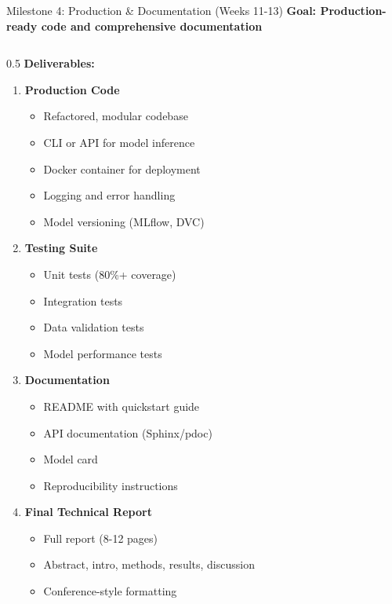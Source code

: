 
\begin{frame}{Milestone 4: Production \& Documentation (Weeks 11-13)}
\textbf{Goal: Production-ready code and comprehensive documentation}

\begin{columns}
\begin{column}{0.5\textwidth}
\textbf{Deliverables:}

\begin{enumerate}
\item \textbf{Production Code}
   \begin{itemize}
   \item Refactored, modular codebase
   \item CLI or API for model inference
   \item Docker container for deployment
   \item Logging and error handling
   \item Model versioning (MLflow, DVC)
   \end{itemize}

\item \textbf{Testing Suite}
   \begin{itemize}
   \item Unit tests (80\%+ coverage)
   \item Integration tests
   \item Data validation tests
   \item Model performance tests
   \end{itemize}

\item \textbf{Documentation}
   \begin{itemize}
   \item README with quickstart guide
   \item API documentation (Sphinx/pdoc)
   \item Model card \cite{mitchell2019model}
   \item Reproducibility instructions
   \end{itemize}

\item \textbf{Final Technical Report}
   \begin{itemize}
   \item Full report (8-12 pages)
   \item Abstract, intro, methods, results, discussion
   \item Conference-style formatting
   \end{itemize}
\end{enumerate}
\end{column}


\end{columns}
\end{frame}
